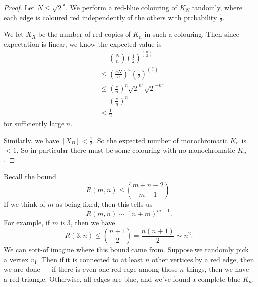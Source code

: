 \documentclass[a4paper]{article}
\begin{document}
\begin{proof}
  Let $N \leq \sqrt{2}^n$. We perform a red-blue colouring of $K_N$ randomly, where each edge is coloured red independently of the others with probability $\frac{1}{2}$.

  We let $X_R$ be the number of red copies of $K_n$ in such a colouring. Then since expectation is linear, we know the expected value is
  \begin{align*}
    [X_R] &= \binom{N}{n} \left(\frac{1}{2}\right)^{\binom{n}{2}}\\
    &\leq \left(\frac{eN}{n}\right)^n \left(\frac{1}{2}\right)^{\binom{n}{2}}\\
    &\leq \left(\frac{e}{n}\right)^n \sqrt{2}^{n^2} \sqrt{2}^{-n^2}\\
    &= \left(\frac{e}{n}\right)^{n}\\
    &< \frac{1}{2}
  \end{align*}
  for sufficiently large $n$.

  Similarly, we have $[X_B] < \frac{1}{2}$. So the expected number of monochromatic $K_n$ is $< 1$. So in particular there must be some colouring with no monochromatic $K_n$.
\end{proof}

Recall the bound
\[
  R(m, n) \leq \binom{m + n - 2}{m - 1}.
\]
If we think of $m$ as being fixed, then this tells us
\[
  R(m, n) \sim (n + m)^{m - 1}.
\]
For example, if $m$ is $3$, then we have
\[
  R(3, n) \leq \binom{n + 1}{2} = \frac{n(n + 1)}{2} \sim n^2.
\]
We can sort-of imagine where this bound came from. Suppose we randomly pick a vertex $v_1$. Then if it is connected to at least $n$ other vertices by a red edge, then we are done --- if there is even one red edge among those $n$ things, then we have a red triangle. Otherwise, all edges are blue, and we've found a complete blue $K_n$.
\end{document}
